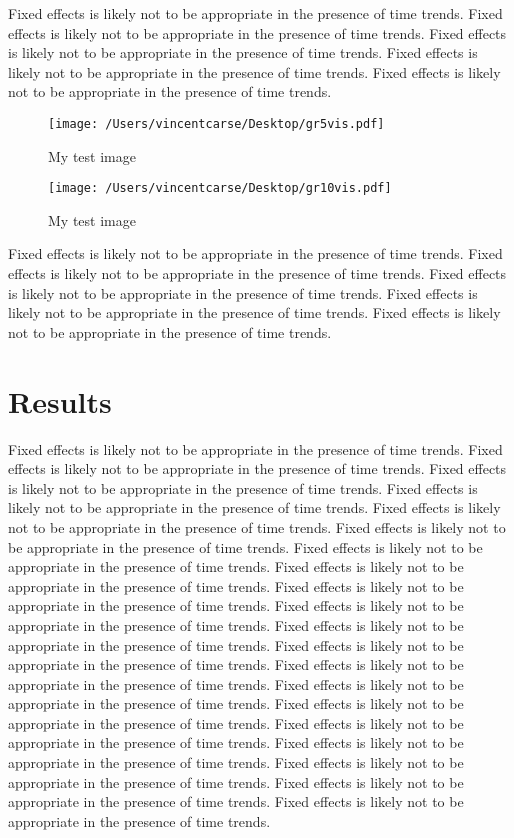 \documentclass[11pt]{article}
\begin{document}
Fixed effects is likely not to be appropriate in the presence of time trends. 
Fixed effects is likely not to be appropriate in the presence of time trends. 
Fixed effects is likely not to be appropriate in the presence of time trends. 
Fixed effects is likely not to be appropriate in the presence of time trends. 
Fixed effects is likely not to be appropriate in the presence of time trends. 

\begin{figure}
\label{image-myimage}
\texttt{[image: /Users/vincentcarse/Desktop/gr5vis.pdf]}
\caption{My test image}
\end{figure}


\begin{figure}
\label{image-myimage}
\texttt{[image: /Users/vincentcarse/Desktop/gr10vis.pdf]}
\caption{My test image}
\end{figure}

Fixed effects is likely not to be appropriate in the presence of time trends. 
Fixed effects is likely not to be appropriate in the presence of time trends. 
Fixed effects is likely not to be appropriate in the presence of time trends. 
Fixed effects is likely not to be appropriate in the presence of time trends. 
Fixed effects is likely not to be appropriate in the presence of time trends. 

\section{Results}

Fixed effects is likely not to be appropriate in the presence of time trends. 
Fixed effects is likely not to be appropriate in the presence of time trends. 
Fixed effects is likely not to be appropriate in the presence of time trends. 
Fixed effects is likely not to be appropriate in the presence of time trends. 
Fixed effects is likely not to be appropriate in the presence of time trends. 
Fixed effects is likely not to be appropriate in the presence of time trends. 
Fixed effects is likely not to be appropriate in the presence of time trends. 
Fixed effects is likely not to be appropriate in the presence of time trends. 
Fixed effects is likely not to be appropriate in the presence of time trends. 
Fixed effects is likely not to be appropriate in the presence of time trends. 
Fixed effects is likely not to be appropriate in the presence of time trends. 
Fixed effects is likely not to be appropriate in the presence of time trends. 
Fixed effects is likely not to be appropriate in the presence of time trends. 
Fixed effects is likely not to be appropriate in the presence of time trends. 
Fixed effects is likely not to be appropriate in the presence of time trends. 
Fixed effects is likely not to be appropriate in the presence of time trends. 
Fixed effects is likely not to be appropriate in the presence of time trends. 
Fixed effects is likely not to be appropriate in the presence of time trends. 
Fixed effects is likely not to be appropriate in the presence of time trends. 
Fixed effects is likely not to be appropriate in the presence of time trends. 
\end{document}
